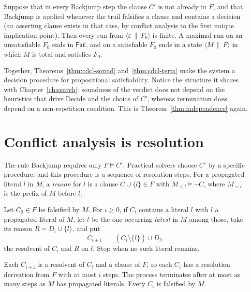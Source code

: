 \begin{theorem}
\label{thm:cdcl-term}
 Suppose that in every \textsf{Backjump} step the clause $C'$ is not already in $F$, and that \textsf{Backjump} is applied whenever the trail falsifies a clause and contains a decision (an asserting clause exists in that case, by conflict analysis to the first unique implication point). Then every run from $\langle\varepsilon\,\|\,F_0\rangle$ is finite. A maximal run on an unsatisfiable $F_0$ ends in $\mathsf{Fail}$, and on a satisfiable $F_0$ ends in a state $\langle M\,\|\,F\rangle$ in which $M$ is total and satisfies $F_0$.
\end{theorem}

Together, Theorems~\ref{thm:cdcl-sound} and~\ref{thm:cdcl-term} make the system a decision procedure for propositional satisfiability. Notice the structure it shares with Chapter~\ref{ch:search}: soundness of the verdict does not depend on the heuristics that drive \textsf{Decide} and the choice of $C'$, whereas termination does depend on a non-repetition condition. This is Theorem~\ref{thm:independence} again.

\section{Conflict analysis is resolution}
\label{sec:conflict-analysis}

The rule \textsf{Backjump} requires only $F\models C'$. Practical solvers choose $C'$ by a specific procedure, and this procedure is a sequence of resolution steps. For a propagated literal $l$ in $M$, a \emph{reason} for $l$ is a clause $C\cup\{l\}\in F$ with $M_{<l}\models\neg C$, where $M_{<l}$ is the prefix of $M$ before $l$.

\begin{definition}
\label{def:analysis}
Let $C_0\in F$ be falsified by $M$. For $i\ge0$, if $C_i$ contains a literal $\overline{l}$ with $l$ a propagated literal of $M$, let $l$ be the one occurring \emph{latest} in $M$ among those, take its reason $R=D_i\cup\{l\}$, and put
\[
C_{i+1}\;=\;(C_i\setminus\{\overline{l}\})\cup D_i,
\]
the resolvent of $C_i$ and $R$ on $l$. Stop when no such literal remains.
\end{definition}

\begin{proposition}
\label{prop:analysis-resolution}
Each $C_{i+1}$ is a resolvent of $C_i$ and a clause of $F$, so each $C_i$ has a resolution derivation from $F$ with at most $i$ steps. The process terminates after at most as many steps as $M$ has propagated literals. Every $C_i$ is falsified by $M$.
\end{proposition}

